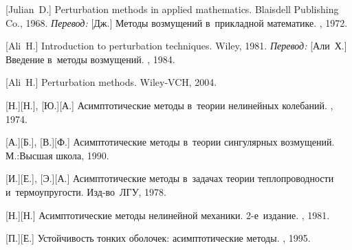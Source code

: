 \begin{thebibliography}{123}
\begin{otherlanguage}{russian}
[Julian~D.] Perturbation methods in applied mathematics. Blaisdell Publishing Co., 1968. 
\emph{Перевод:} [Дж.] Методы возмущений в~прикладной математике. \mirpublisher, 1972. 

[Ali~H.] Introduction to perturbation techniques. Wiley, 1981. 
\emph{Перевод:} [Али~Х.] Введение в~методы возмущений. \mirpublisher, 1984. 

[Ali~H.] Perturbation methods. Wiley-VCH, 2004. 

[Н.][Н.], [Ю.][А.] Асимптотические методы в~теории нелинейных колебаний. \naukapublisher, 1974. 

[А.][Б.], [В.][Ф.] Асимптотические методы в~теории сингулярных возмущений. М.:\;Высшая школа, 1990. 

[И.][Е.], %
[Э.][А.] %
Асимптотические методы в~задачах теории теплопроводности и~термоупругости. Изд\hbox{-}во~ЛГУ, 1978. 

[Н.][Н.] Асимптотические методы нелинейной механики. 2\hbox{-}е~издание. \naukapublisher, 1981. 

[П.][Е.] Устойчивость тонких оболочек: асимптотические методы. \naukapublisher, 1995. 

%
%




\end{otherlanguage}
\end{thebibliography}
